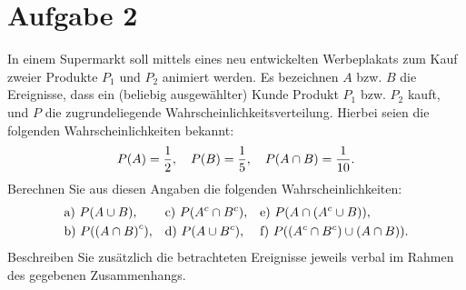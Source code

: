 \documentclass{exercise}
\begin{document}
    \section*{Aufgabe 2}

    \begin{problem}
        In einem Supermarkt soll mittels eines neu entwickelten Werbeplakats zum Kauf zweier Produkte \(P_1\) und \(P_2\) animiert werden.
        Es bezeichnen \(A\) bzw. \(B\) die Ereignisse, dass ein (beliebig ausgewählter) Kunde Produkt \(P_1\) bzw. \(P_2\) kauft, und \(P\) die zugrundeliegende Wahrscheinlichkeitsverteilung.
        Hierbei seien die folgenden Wahrscheinlichkeiten bekannt:
        \[
            P\parentheses*{A} = \frac{1}{2}, \quad P\parentheses*{B} = \frac{1}{5}, \quad P\parentheses*{A \cap B} = \frac{1}{10}.
        \]
        Berechnen Sie aus diesen Angaben die folgenden Wahrscheinlichkeiten:
        \begin{align*}
            &\text{a) }P\parentheses*{A \cup B}, & &\text{c) }P\parentheses*{A^c \cap B^c}, & &\text{e) }P\parentheses*{A \cap \parentheses*{A^c \cup B}},\\
            &\text{b) }P\parentheses*{\parentheses*{A \cap B}^c}, & &\text{d) }P\parentheses*{A \cup B^c}, & &\text{f) }P\parentheses*{\parentheses*{A^c \cap B^c} \cup \parentheses*{A \cap B}}.
        \end{align*}
        Beschreiben Sie zusätzlich die betrachteten Ereignisse jeweils verbal im Rahmen des gegebenen Zusammenhangs.
    \end{problem}
\end{document}
